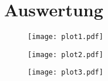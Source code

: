 \section{Auswertung}
\label{sec:Auswertung}

\begin{table}
  \centering
  \label{tab:messwerte}
\end{table}
\begin{figure}
  \texttt{[image: plot1.pdf]}
\end{figure}
\begin{figure}
  \texttt{[image: plot2.pdf]}
\end{figure}
\begin{figure}
  \texttt{[image: plot3.pdf]}
\end{figure}


